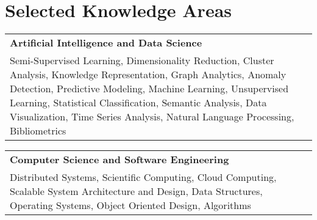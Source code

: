 \documentclass[10pt, letterpaper]{article}
\newcommand{\tabularxwidth}{\textwidth}
\begin{document}


    
        \section{Selected Knowledge Areas}

    
        \begin{tabularx}{\tabularxwidth}{X}
            \textbf{Artificial Intelligence and Data Science} \\
            
            Semi-Supervised Learning, 
            Dimensionality Reduction, 
            Cluster Analysis, 
            Knowledge Representation, 
            Graph Analytics, 
            Anomaly Detection, 
            Predictive Modeling, 
            Machine Learning, 
            Unsupervised Learning, 
            Statistical Classification, 
            Semantic Analysis, 
            Data Visualization, 
            Time Series Analysis, 
            Natural Language Processing, 
            Bibliometrics \\
        \end{tabularx}

        
            \vspace{.5em}
        

    
        \begin{tabularx}{\tabularxwidth}{X}
            \textbf{Computer Science and Software Engineering} \\
            
            Distributed Systems, 
            Scientific Computing, 
            Cloud Computing, 
            Scalable System Architecture and Design, 
            Data Structures, 
            Operating Systems, 
            Object Oriented Design, 
            Algorithms \\
        \end{tabularx}

        
\end{document}
